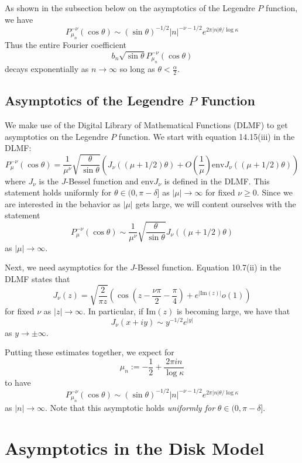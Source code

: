 \documentclass[]{article}
\begin{document}
As shown in the subsection below on the asymptotics of the Legendre $P$ function, we have
$$
P_{\mu_n}^{-\nu}(\cos\theta) \sim (\sin\theta)^{-1/2}|n|^{-\nu-1/2}e^{2\pi|n|\theta/\log\kappa}
$$
Thus the entire Fourier coefficient
$$
b_n\sqrt{\sin\theta}P_{\mu_n}^{-\nu}(\cos\theta)
$$
decays exponentially as $n \rightarrow \infty$ so long as $\theta < \frac{\alpha}{2}$.

\subsection*{Asymptotics of the Legendre $P$ Function}

We make use of the Digital Library of Mathematical Functions (DLMF) to get asymptotics on the Legendre $P$ function.
We start with equation 14.15(iii) in the DLMF:
$$
P_\mu^{-\nu}(\cos\theta) = \frac{1}{\mu^\nu}\sqrt{\frac{\theta}{\sin\theta}}\left( J_\nu((\mu+1/2)\theta) + O\left( \frac{1}{\mu} \right)\text{env}J_\nu((\mu+1/2)\theta) \right)
$$
where $J_\nu$ is the $J$-Bessel function and $\text{env}J_\nu$ is defined in the DLMF.
This statement holds uniformly for $\theta \in (0, \pi - \delta]$ as $|\mu| \rightarrow \infty$ for fixed $\nu \geq 0$.
Since we are interested in the behavior as $|\mu|$ gets large, we will content ourselves with the statement
$$
P_\mu^{-\nu}(\cos\theta) \sim \frac{1}{\mu^\nu}\sqrt{\frac{\theta}{\sin\theta}}J_\nu((\mu+1/2)\theta)
$$
as $|\mu| \rightarrow \infty$.

Next, we need asymptotics for the $J$-Bessel function.
Equation 10.7(ii) in the DLMF states that
$$
J_\nu(z) = \sqrt{\frac{2}{\pi z}}\left( \cos\left(z - \frac{\nu\pi}{2} - \frac{\pi}{4}\right) + e^{|\text{Im}(z)|}o(1) \right)
$$
for fixed $\nu$ as $|z| \rightarrow \infty$.
In particular, if $\text{Im}(z)$ is becoming large, we have that
$$
J_\nu(x + iy) \sim y^{-1/2}e^{|y|}
$$
as $y \rightarrow \pm\infty$.

Putting these estimates together, we expect for
$$
\mu_n := -\frac{1}{2} + \frac{2\pi in}{\log\kappa}
$$
to have
\begin{equation}\label{legPAsymptotic}
P_{\mu_n}^{-\nu}(\cos\theta) \sim (\sin\theta)^{-1/2}|n|^{-\nu-1/2}e^{2\pi|n|\theta/\log\kappa}
\end{equation}
as $|n| \rightarrow \infty$.
Note that this asymptotic holds \textit{uniformly for} $\theta \in (0, \pi - \delta]$.

\section*{Asymptotics in the Disk Model}
\end{document}
